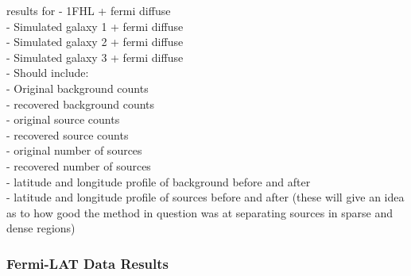 \documentclass{PoS}
\begin{document}
\begin{table}
\centering
{}
\caption{Galactic plane fluxes for separated background images of the input simulation image catalogs.}
\end{table}



results for
- 1FHL + fermi diffuse\\
- Simulated galaxy 1 + fermi diffuse\\
- Simulated galaxy 2 + fermi diffuse\\
- Simulated galaxy 3 + fermi diffuse\\

- Should include:\\
    - Original background counts\\
    - recovered background counts\\
    - original source counts\\
    - recovered source counts\\
    - original number of sources\\
    - recovered number of sources\\
    - latitude and longitude profile of background before and after\\
    - latitude and longitude profile of sources before and after
        (these will give an idea as to how good the method in question was at separating sources in sparse and dense regions)

\subsubsection{Fermi-LAT Data Results}
\end{document}
